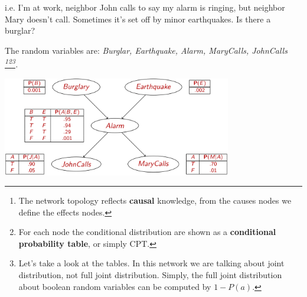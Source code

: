 \begin{example}
    i.e. I'm at work, neighbor John calls to say my alarm is ringing, but neighbor Mary doesn't call. Sometimes it's set off by minor earthquakes. Is there a burglar? \vspace{3.5pt}

    The random variables are: \it Burglar, Earthquake, Alarm, MaryCalls, JohnCalls \footnote{The network topology reflects \textbf{causal} knowledge, from the causes nodes we define the effects nodes.}\footnote{For each node the conditional distribution are shown as a \textbf{conditional probability table}, or simply CPT.}\footnote{Let's take a look at the tables. In this network we are talking about joint distribution, not full joint distribution. Simply, the full joint distribution about boolean random variables can be computed by $1-P(a)$.}. \vspace{3.5pt}
    \begin{center}
        \includegraphics[width=0.75\textwidth]{img/img3.png} \vspace{3.5pt}
    \end{center}
\end{example}

